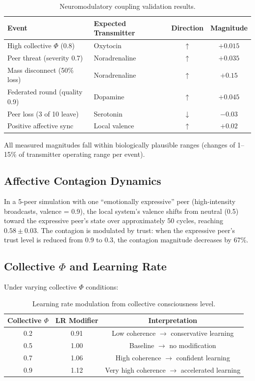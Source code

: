 \documentclass[11pt,a4paper]{article}
\begin{document}
\begin{table}[h]
\centering
\caption{Neuromodulatory coupling validation results.}
\label{tab:neuromod_coupling}
\begin{tabular}{llcc}
\toprule
\textbf{Event} & \textbf{Expected Transmitter} & \textbf{Direction} & \textbf{Magnitude} \\
\midrule
High collective $\Phi$ (0.8) & Oxytocin & $\uparrow$ & $+0.015$ \\
Peer threat (severity 0.7) & Noradrenaline & $\uparrow$ & $+0.035$ \\
Mass disconnect (50\% loss) & Noradrenaline & $\uparrow$ & $+0.15$ \\
Federated round (quality 0.9) & Dopamine & $\uparrow$ & $+0.045$ \\
Peer loss (3 of 10 leave) & Serotonin & $\downarrow$ & $-0.03$ \\
Positive affective sync & Local valence & $\uparrow$ & $+0.02$ \\
\bottomrule
\end{tabular}
\end{table}

All measured magnitudes fall within biologically plausible ranges (changes of 1--15\% of transmitter operating range per event).

\subsection{Affective Contagion Dynamics}

In a 5-peer simulation with one ``emotionally expressive'' peer (high-intensity broadcasts, valence = 0.9), the local system's valence shifts from neutral (0.5) toward the expressive peer's state over approximately 50 cycles, reaching $0.58 \pm 0.03$. The contagion is modulated by trust: when the expressive peer's trust level is reduced from 0.9 to 0.3, the contagion magnitude decreases by 67\%.

\subsection{Collective $\Phi$ and Learning Rate}

Under varying collective $\Phi$ conditions:

\begin{table}[h]
\centering
\caption{Learning rate modulation from collective consciousness level.}
\label{tab:lr_mod}
\begin{tabular}{ccc}
\toprule
\textbf{Collective $\Phi$} & \textbf{LR Modifier} & \textbf{Interpretation} \\
\midrule
0.2 & 0.91 & Low coherence $\to$ conservative learning \\
0.5 & 1.00 & Baseline $\to$ no modification \\
0.7 & 1.06 & High coherence $\to$ confident learning \\
0.9 & 1.12 & Very high coherence $\to$ accelerated learning \\
\bottomrule
\end{tabular}
\end{table}
\end{document}
